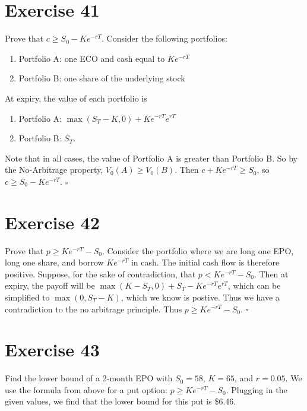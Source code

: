 \documentclass{article}
\begin{document}
\section*{Exercise 41}
\begin{flushleft}
    Prove that $c \geq S_0 - Ke^{-rT}$. Consider the following portfolios:
    \begin{enumerate}
        \item Portfolio A: one ECO and cash equal to $Ke^{-rT}$
        \item Portfolio B: one share of the underlying stock
    \end{enumerate}
    At expiry, the value of each portfolio is
    \begin{enumerate}
        \item Portfolio A: $\max{(S_T - K, 0)} + Ke^{-rT}e^{rT}$
        \item Portfolio B: $S_T$.
    \end{enumerate}
    Note that in all cases, the value of Portfolio A is greater than Portfolio B. So by the No-Arbitrage property, $V_0(A) \geq V_0(B)$.
    Then $c + Ke^{-rT} \geq S_0$, so $c \geq S_0 - Ke^{-rT}$. $\square$
\end{flushleft}

\section*{Exercise 42}
\begin{flushleft}
    Prove that $p \geq Ke^{-rT} - S_0$. Consider the portfolio where we are long one EPO, long one share, and borrow $Ke^{-rT}$ in cash. The initial cash flow is therefore positive. Suppose, for the sake of contradiction, that
    $p < Ke^{-rT} - S_0$. Then at expiry, the payoff will be $\max(K-S_T, 0) + S_T - Ke^{-rT}e^{rT}$, which can be simplified to $\max(0, S_T - K)$, which we know is postive. Thus we have a contradiction to the no arbitrage principle.
    Thus $p \geq Ke^{-rT} - S_0$. $\square$
\end{flushleft}

\section*{Exercise 43}
Find the lower bound of a 2-month EPO with $S_0 = 58$, $K = 65$, and $r = 0.05$.
We use the formula from above for a put option: $p \geq Ke^{-rT} - S_0$. Plugging in the given values, we find that the lower bound for this put is \$6.46.
\end{document}
